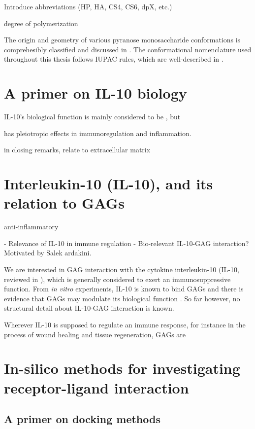 Introduce abbreviations (HP, HA, CS4, CS6, dpX, etc.)


degree of polymerization


The origin and geometry of various pyranose monosaccharide conformations is
comprehesibly classified and discussed in
\cite{classification_pyranose_conformers_1960}. The conformational nomenclature
used throughout this thesis follows IUPAC rules, which are well-described in
\cite{iupac_gag_conformations_1980}.


\section{A primer on IL-10 biology}

 IL-10's biological function is mainly considered to be
, but

 has pleiotropic effects in immunoregulation and
inflammation.


        in closing remarks, relate to extracellular matrix


\section{Interleukin-10 (IL-10), and its relation to GAGs}


 anti-inflammatory

- Relevance of IL-10 in immune regulation
- Bio-relevant IL-10-GAG interaction? Motivated by Salek ardakini.

We are interested in GAG interaction with the cytokine interleukin-10 (IL-10,
reviewed in \cite{moore_2001}), which is generally considered to exert an
immunosuppressive function. From \textit{in vitro} experiments, IL-10 is known
to bind GAGs and there is evidence that GAGs may modulate its biological
function \cite{salek_ardakani_2000}. So far however, no structural detail about
IL-10-GAG interaction is known.


Wherever IL-10 is supposed to
regulate an immune response, for instance in the process of wound healing and
tissue regeneration, GAGs are


\section{In-silico methods for investigating receptor-ligand interaction}

\subsection{A primer on docking methods}


